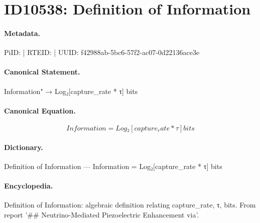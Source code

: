 \section*{ID10538: Definition of Information}
\paragraph{Metadata.}
PiID:  | RTEID:  | UUID: f42988ab-5bc6-57f2-ac07-0d22136ace3e

\paragraph{Canonical Statement.}
Information" → Log₂[capture\_rate * τ] bits

\paragraph{Canonical Equation.}
\[
Information = Log₂[capture_rate * τ] bits
\]

\paragraph{Dictionary.}
Definition of Information — Information = Log₂[capture\_rate * τ] bits

\paragraph{Encyclopedia.}
Definition of Information: algebraic definition relating capture\_rate, τ, bits. From report '\#\# Neutrino-Mediated Piezoelectric Enhancement via'.
